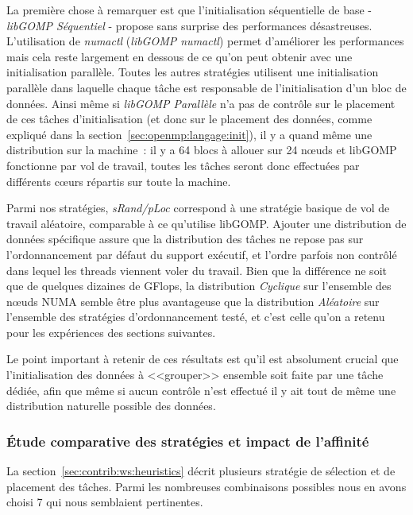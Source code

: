 La première chose à remarquer est que l'initialisation séquentielle de base - \emph{libGOMP Séquentiel} - propose sans surprise des performances désastreuses. L'utilisation de \emph{numactl} (\emph{libGOMP numactl}) permet d'améliorer les performances mais cela reste largement en dessous de ce qu'on peut obtenir avec une initialisation parallèle.
Toutes les autres stratégies utilisent une initialisation parallèle dans laquelle chaque tâche est responsable de l'initialisation d'un bloc de données.
Ainsi même si \emph{libGOMP Parallèle} n'a pas de contrôle sur le placement de ces tâches d'initialisation (et donc sur le placement des données, comme expliqué dans la section~\ref{sec:openmp:langage:init}), il y a quand même une distribution sur la machine~: il y a 64 blocs à allouer sur 24 nœuds et libGOMP fonctionne par vol de travail, toutes les tâches seront donc effectuées par différents cœurs répartis sur toute la machine.

Parmi nos stratégies, \emph{sRand/pLoc} correspond à une stratégie basique de vol de travail aléatoire, comparable à ce qu'utilise libGOMP.
Ajouter une distribution de données spécifique assure que la distribution des tâches ne repose pas sur l'ordonnancement par défaut du support exécutif, et l'ordre parfois non contrôlé dans lequel les threads viennent voler du travail.
Bien que la différence ne soit que de quelques dizaines de GFlops, la distribution \emph{Cyclique} sur l'ensemble des nœuds NUMA semble être plus avantageuse que la distribution \emph{Aléatoire} sur l'ensemble des stratégies d'ordonnancement testé, et c'est celle qu'on a retenu pour les expériences des sections suivantes.

Le point important à retenir de ces résultats est qu'il est absolument crucial que l'initialisation des données à <<grouper>> ensemble soit faite par une tâche dédiée, afin que même si aucun contrôle n'est effectué il y ait tout de même une distribution naturelle possible des données.



\subsubsection{Étude comparative des stratégies et impact de l'affinité}

La section~\ref{sec:contrib:ws:heuristics} décrit plusieurs stratégie de sélection et de placement des tâches.
Parmi les nombreuses combinaisons possibles nous en avons choisi 7 qui nous semblaient pertinentes.

